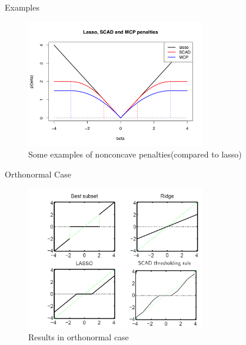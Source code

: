 \documentclass{beamer}
\begin{document}
    \begin{frame}{Examples}
     \begin{figure}[H] %
    \centering %
    \includegraphics[width=0.7\textwidth]{example.png} %
    \caption{Some examples of nonconcave penalties(compared to lasso)} %
    \end{figure} 
    \end{frame}
    
    \begin{frame}{Orthonormal Case}
    \begin{figure}[H] %
    \centering %
    \includegraphics[width=0.7\textwidth]{image.png}
    \caption{Results in orthonormal case}
    \end{figure} 
        
    \end{frame}
\end{document}
